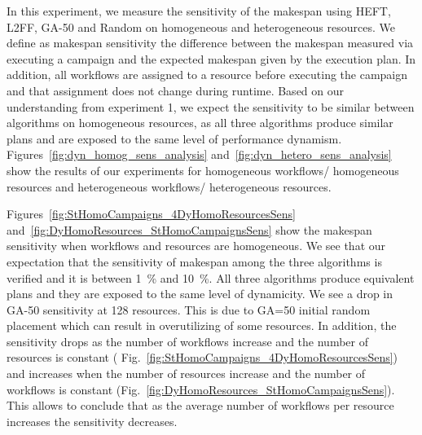 In this experiment, we measure the sensitivity of the makespan using HEFT, L2FF, GA-50 and Random on homogeneous and heterogeneous resources.
We define as makespan sensitivity the difference between the makespan measured via executing a campaign and the expected makespan given by the execution plan.
In addition, all workflows are assigned to a resource before executing the campaign and that assignment does not change during runtime.
Based on our understanding from experiment 1, we expect the sensitivity to be similar between algorithms on homogeneous resources, as all three algorithms produce similar plans and are exposed to the same level of performance dynamism.
Figures~\ref{fig:dyn_homog_sens_analysis} and~\ref{fig:dyn_hetero_sens_analysis} show the results of our experiments for homogeneous workflows/ homogeneous resources and heterogeneous workflows/ heterogeneous resources.

Figures~\ref{fig:StHomoCampaigns_4DyHomoResourcesSens} and~\ref{fig:DyHomoResources_StHomoCampaignsSens} show the makespan sensitivity when workflows and resources are homogeneous.
We see that our expectation that the sensitivity of makespan among the three algorithms is verified and it is between 1~\% and 10~\%.
All three algorithms produce equivalent plans and they are exposed to the same level of dynamicity.
We see a drop in GA-50 sensitivity at 128 resources.
This is due to GA=50 initial random placement which can result in overutilizing of some resources.
In addition, the sensitivity drops as the number of workflows increase and the number of resources is constant ( Fig.~\ref{fig:StHomoCampaigns_4DyHomoResourcesSens}) and increases when the number of resources increase and the number of workflows is constant (Fig.~\ref{fig:DyHomoResources_StHomoCampaignsSens}).
This allows to conclude that as the average number of workflows per resource increases the sensitivity decreases.


